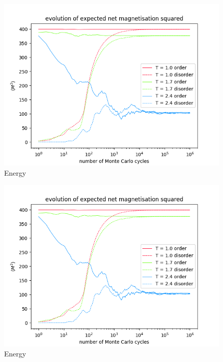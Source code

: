 \documentclass[nofootinbib,reprint,english]{revtex4-1}
\begin{document}
\begin{figure}
\centering
\includegraphics[scale=0.5]{../output/figures/experiment2/netmagnetisation2.png}
\caption{Energy}\label{fig:experiment2_netmagnetisation}
\end{figure}

\begin{figure}
\centering
\includegraphics[scale=0.5]{../output/figures/experiment2/netmagnetisation2.png}
\caption{Energy}\label{fig:experiment2_netmagnetisation2}
\end{figure}
\end{document}
